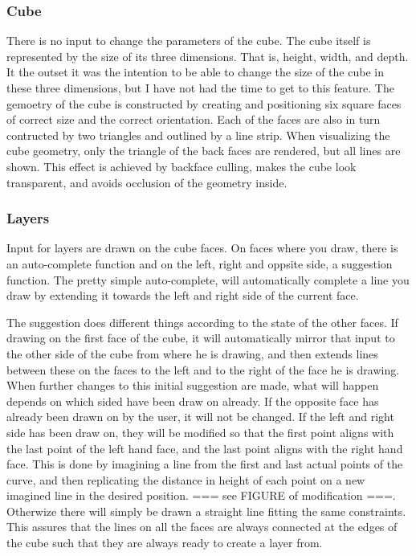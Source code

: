\documentclass[a4paper,10pt]{article}
\begin{document}
\subsubsection{Cube}
There is no input to change the parameters of the cube. The cube itself is represented by the size of its three dimensions. That is, height, width, and depth. It the outset it was the intention to be able to change the size of the cube in these three dimensions, but I have not had the time to get to this feature. The gemoetry of the cube is constructed by creating and positioning six square faces of correct size and the correct orientation. Each of the faces are also in turn contructed by two triangles and outlined by a line strip. When visualizing the cube geometry, only the triangle of the back faces are rendered, but all lines are shown. This effect is achieved by backface culling, makes the cube look transparent, and avoids occlusion of the geometry inside.

\subsubsection{Layers}
Input for layers are drawn on the cube faces. On faces where you draw, there is an auto-complete function and on the left, right and oppsite side, a suggestion function. The pretty simple auto-complete, will automatically complete a line you draw by extending it towards the left and right side of the current face. 

The suggestion does different things according to the state of the other faces. If drawing on the first face of the cube, it will automatically mirror that input to the other side of the cube from where he is drawing, and then extends lines between these on the faces to the left and to the right of the face he is drawing. When further changes to this initial suggestion are made, what will happen depends on which sided have been draw on already. If the opposite face has already been drawn on by the user, it will not be changed. If the left and right side has been draw on, they will be modified so that the first point aligns with the last point of the left hand face, and the last point aligns with the right hand face. This is done by imagining a line from the first and last actual points of the curve, and then replicating the distance in height of each point on a new imagined line in the desired position. === see FIGURE of modification ===. Otherwize there will simply be drawn a straight line fitting the same constraints. This assures that the lines on all the faces are always connected at the edges of the cube such that they are always ready to create a layer from.
\end{document}
